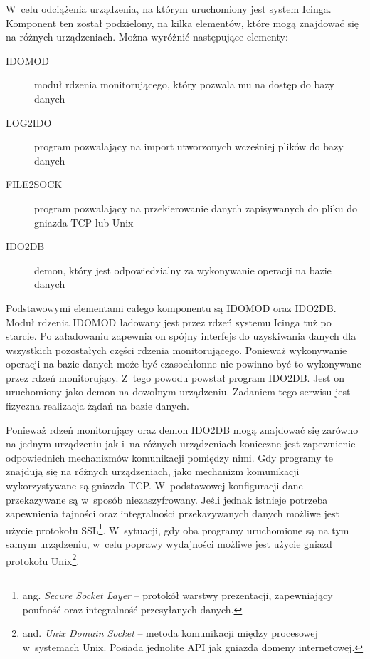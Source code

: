 W~celu odciążenia urządzenia, na którym uruchomiony jest system
Icinga. Komponent ten został podzielony, na kilka elementów, które
mogą znajdować się na różnych urządzeniach. Można wyróżnić następujące
elementy:

\begin{description}
\item[IDOMOD] moduł rdzenia monitorującego, który pozwala mu na dostęp
  do bazy danych
\item[LOG2IDO] program pozwalający na import utworzonych wcześniej
  plików do bazy danych
\item[FILE2SOCK] program pozwalający na przekierowanie danych
  zapisywanych do pliku do gniazda TCP lub Unix
\item[IDO2DB] demon, który jest odpowiedzialny za wykonywanie operacji
  na bazie danych
\end{description}

Podstawowymi elementami całego komponentu są IDOMOD oraz IDO2DB. Moduł
rdzenia IDOMOD ładowany jest przez rdzeń systemu Icinga tuż po
starcie. Po załadowaniu zapewnia on spójny interfejs do uzyskiwania
danych dla wszystkich pozostałych części rdzenia
monitorującego. Ponieważ wykonywanie operacji na bazie danych może być
czasochłonne nie powinno być to wykonywane przez rdzeń
monitorujący. Z~tego powodu powstał program IDO2DB. Jest on
uruchomiony jako demon na dowolnym urządzeniu. Zadaniem tego serwisu
jest fizyczna realizacja żądań na bazie danych.

Ponieważ rdzeń monitorujący oraz demon IDO2DB mogą znajdować się
zarówno na jednym urządzeniu jak i~na różnych urządzeniach konieczne
jest zapewnienie odpowiednich mechanizmów komunikacji pomiędzy nimi.
Gdy programy te znajdują się na różnych urządzeniach, jako mechanizm
komunikacji wykorzystywane są gniazda TCP. W~podstawowej konfiguracji
dane przekazywane są w~sposób niezaszyfrowany. Jeśli jednak istnieje
potrzeba zapewnienia tajności oraz integralności przekazywanych danych
możliwe jest użycie protokołu SSL\footnote{ ang. {\em Secure Socket
    Layer} -- protokół warstwy prezentacji, zapewniający poufność oraz
  integralność przesyłanych danych.}. W~sytuacji, gdy oba programy
uruchomione są na tym samym urządzeniu, w~celu poprawy wydajności
możliwe jest użycie gniazd protokołu Unix\footnote{ and. {\em Unix
    Domain Socket} -- metoda komunikacji między procesowej w~systemach
  Unix. Posiada jednolite API jak gniazda domeny internetowej.}.

